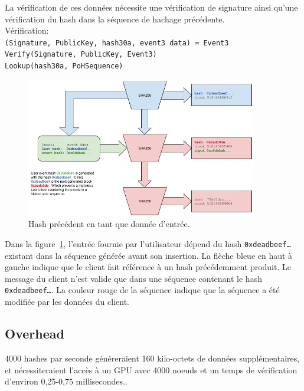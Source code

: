 \documentclass[12pt]{article}
\begin{document}
La vérification de ces données nécessite une vérification de signature ainsi qu’une vérification du hash dans la séquence de hachage précédente.\\
\noindent Vérification:\\

\noindent\texttt{(Signature, PublicKey, hash30a, event3 data) = Event3} \\
\texttt{Verify(Signature, PublicKey, Event3)}\\
\texttt{Lookup(hash30a, PoHSequence)}\\

\begin{figure}
  \begin{center}
    \centering
    \includegraphics[width=0.9\textwidth]{figures/fig_6.png}
    \caption[Fig 6]{Hash précédent en tant que donnée d'entrée.\label{fig:poh_consistance}}
  \end{center}
  \end{figure}

Dans la figure~\ref{fig:poh_consistance}, l’entrée fournie par l’utilisateur dépend du hash \texttt{0xdeadbeef\ldots} existant dans la séquence générée avant son insertion. La flèche bleue en haut à gauche indique que le client fait référence à un hash précédemment produit. Le message du client n'est valide que dans une séquence contenant le hash \texttt{0xdeadbeef\ldots}. La couleur rouge de la séquence indique que la séquence a été modifiée par les données du client.

\subsection{Overhead}
4000 hashes par seconde généreraient 160 kilo-octets de données supplémentaires, et nécessiteraient l'accès à un GPU avec 4000 noeuds et un temps de vérification d'environ 0,25-0,75 millisecondes..
\end{document}
